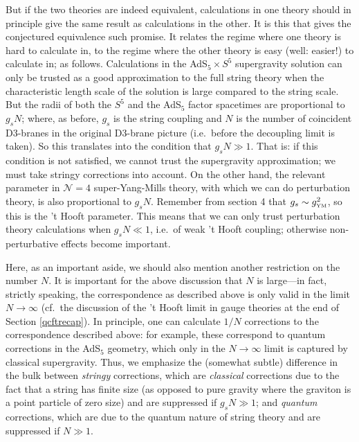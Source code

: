\documentclass[12pt]{article}
\renewcommand{\^}[1]{\hat{#1}}
\newcommand{\tn}[1]{\mbox{\tiny #1}}
\begin{document}
But if the two theories are indeed equivalent, calculations in one theory should in principle give the same result as calculations in the other. It is this that gives the conjectured equivalence such promise. It relates the regime where one theory is hard to calculate in, to the regime where the other theory is easy (well: easier!) to calculate in; as follows. Calculations in the AdS$_5\times S^5$ supergravity solution can only be trusted as a good approximation to the full string theory when the characteristic length scale of the solution is large compared to the string scale. But the radii of both the $S^5$ and the AdS$_5$ factor spacetimes are proportional to $g_s N$; where, as before, $g_s$ is the string coupling and $N$ is the number of coincident D3-branes in the original D3-brane picture (i.e.~before the decoupling limit is taken). So this translates into the condition that $g_s N \gg 1$. That is: if this condition is not satisfied, we cannot trust the supergravity approximation; we must take stringy corrections into account. On the other hand, the relevant parameter in $\mathcal{N}=4$ super-Yang-Mills theory, with which we can do perturbation theory, is also proportional to $g_s N$. Remember from section 4 that $g_s\sim g_{\tn{YM}}^2$, so this is the 't Hooft parameter. This means that we can only trust perturbation theory calculations when $g_s N \ll 1$, i.e.~of weak 't Hooft coupling; otherwise non-perturbative effects become important.


Here, as an important aside, we should also mention another restriction on the number $N$. It is important for the above discussion that $N$ is large---in fact, strictly speaking, the correspondence as described above is only valid in the limit $N\rightarrow \infty$ (cf.~the discussion of the 't Hooft limit in gauge theories at the end of Section \ref{qcftrecap}). In principle, one can calculate $1/N$ corrections to the correspondence described above: for example, these correspond to quantum corrections in the AdS$_5$ geometry, which only in the $N\rightarrow\infty$ limit is captured by classical supergravity. Thus, we emphasize the (somewhat subtle) difference in the bulk between \emph{stringy} corrections, which are \emph{classical} corrections due to the fact that a string has finite size (as opposed to pure gravity where the graviton is a point particle of zero size) and are suppressed if $g_s N\gg 1$; and \emph{quantum} corrections, which are due to the quantum nature of string theory and are suppressed if $N\gg 1$.

\end{document}
